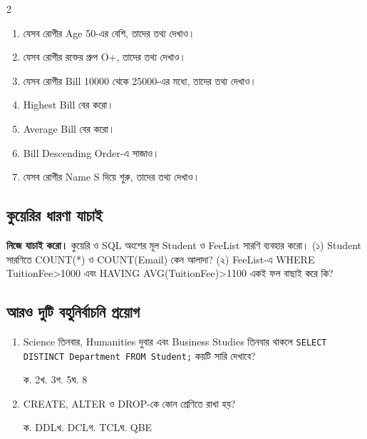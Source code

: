 \begin{multicols}{2}
\begin{enumerate}

\item যেসব রোগীর Age 50-এর বেশি, তাদের তথ্য দেখাও।

\item যেসব রোগীর রক্তের গ্রুপ O+, তাদের তথ্য দেখাও।

\item যেসব রোগীর Bill 10000 থেকে 25000-এর মধ্যে, তাদের তথ্য দেখাও।

\item Highest Bill বের করো।

\item Average Bill বের করো।

\item Bill Descending Order-এ সাজাও।

\item যেসব রোগীর Name S দিয়ে শুরু, তাদের তথ্য দেখাও।

\end{enumerate}
\end{multicols}





\subsection{কুয়েরির ধারণা যাচাই}
\begin{practicebox}
\textbf{নিজে যাচাই করো।} কুয়েরি ও SQL অংশের মূল Student ও FeeList সারণি ব্যবহার করো। (১) Student সারণিতে COUNT(*) ও COUNT(Email) কেন আলাদা? (২) FeeList-এ WHERE TuitionFee>1000 এবং HAVING AVG(TuitionFee)>1100 একই ফল বাছাই করে কি?

\end{practicebox}

\subsection{আরও দুটি বহুনির্বাচনি প্রয়োগ}
\begin{enumerate}
\item Science তিনবার, Humanities দুবার এবং Business Studies তিনবার থাকলে \texttt{SELECT DISTINCT Department FROM Student;} কয়টি সারি দেখাবে?\par
ক. 2\quad খ. 3\quad গ. 5\quad ঘ. 8\par
{}
\item CREATE, ALTER ও DROP-কে কোন শ্রেণিতে রাখা হয়?\par
ক. DDL\quad খ. DCL\quad গ. TCL\quad ঘ. QBE\par
{}
\end{enumerate}


